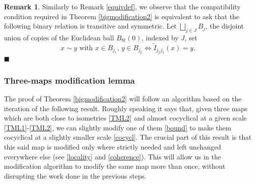 \documentclass[11pt]{article}
\newcommand{\fr}{\penalty-20\null\hfill$\blacksquare$}
\theoremstyle{plain}
\theoremstyle{definition}
\newtheorem{remark}[theorem]{Remark}
\numberwithin{equation}{section}
\begin{document}
\begin{remark}
	Similarly to Remark \ref{equivdef}, we observe that the compatibility condition required in Theorem \ref{bigmodification2} is equivalent to ask  that the following binary relation is  transitive and symmetric. Let $\bigsqcup_{j\in J} B_j$, the disjoint union of  copies of the Euclidean ball $B_{8t}(0)$, indexed by $J$, set
	\[x \sim y \text{ with } x \in B_{j_1}, \,y \in B_{j_2}\Longleftrightarrow \tilde I_{j_2j_1}(x)=y .\]\fr
\end{remark}



\subsubsection{Three-maps modification lemma}\label{sec:basic}
The proof of Theorem \ref{bigmodification2} will follow an algorithm based on the iteration of the following result. Roughly speaking it says that, given three maps which are
both close to isometries \eqref{TML2} and almost cocyclical at a given scale \eqref{TML1}-\eqref{TML2}, we can slightly modify one of them \eqref{bound} to make them cocyclical at a slightly smaller scale \eqref{cocycl}. The crucial part of this result is that this said map is modified only where strictly needed and left unchanged everywhere else (see \eqref{locality} and \eqref{coherence}). This will allow us in the modification algorithm to modify the same map more than once, without disrupting the work done in the previous steps.
\end{document}
